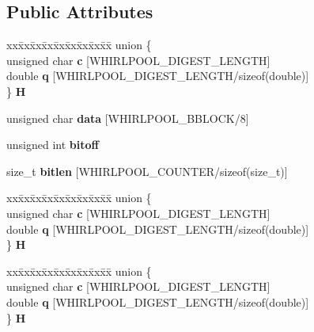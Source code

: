 \subsection*{Public Attributes}
\begin{DoxyCompactItemize}
\item 
\mbox{\label{structWHIRLPOOL__CTX_a40bf2385915656d24b4dd0ea1c08e37c}} 
\begin{tabbing}
xx\=xx\=xx\=xx\=xx\=xx\=xx\=xx\=xx\=\kill
union \{\\
\>unsigned char {\bfseries c} \mbox{[}WHIRLPOOL\_DIGEST\_LENGTH\mbox{]}\\
\>double {\bfseries q} \mbox{[}WHIRLPOOL\_DIGEST\_LENGTH/sizeof(double)\mbox{]}\\
\} {\bfseries H}\\

\end{tabbing}\item 
\mbox{\label{structWHIRLPOOL__CTX_abebcd0e36220ddee18d3f06a6d90e50b}} 
unsigned char {\bfseries data} \mbox{[}W\+H\+I\+R\+L\+P\+O\+O\+L\+\_\+\+B\+B\+L\+O\+CK/8\mbox{]}
\item 
\mbox{\label{structWHIRLPOOL__CTX_a9af51a2a30f80139879b0f8a52ef08f0}} 
unsigned int {\bfseries bitoff}
\item 
\mbox{\label{structWHIRLPOOL__CTX_aaf2c2699e7c09bd733c762b6223a8f4d}} 
size\+\_\+t {\bfseries bitlen} \mbox{[}W\+H\+I\+R\+L\+P\+O\+O\+L\+\_\+\+C\+O\+U\+N\+T\+ER/sizeof(size\+\_\+t)\mbox{]}
\item 
\mbox{\label{structWHIRLPOOL__CTX_a2054db70df09ade117e26458012a917c}} 
\begin{tabbing}
xx\=xx\=xx\=xx\=xx\=xx\=xx\=xx\=xx\=\kill
union \{\\
\>unsigned char {\bfseries c} \mbox{[}WHIRLPOOL\_DIGEST\_LENGTH\mbox{]}\\
\>double {\bfseries q} \mbox{[}WHIRLPOOL\_DIGEST\_LENGTH/sizeof(double)\mbox{]}\\
\} {\bfseries H}\\

\end{tabbing}\item 
\mbox{\label{structWHIRLPOOL__CTX_a0025f8bdb00f0c391cd7ba8203e82d51}} 
\begin{tabbing}
xx\=xx\=xx\=xx\=xx\=xx\=xx\=xx\=xx\=\kill
union \{\\
\>unsigned char {\bfseries c} \mbox{[}WHIRLPOOL\_DIGEST\_LENGTH\mbox{]}\\
\>double {\bfseries q} \mbox{[}WHIRLPOOL\_DIGEST\_LENGTH/sizeof(double)\mbox{]}\\
\} {\bfseries H}\\


\end{tabbing}
\end{DoxyCompactItemize}
